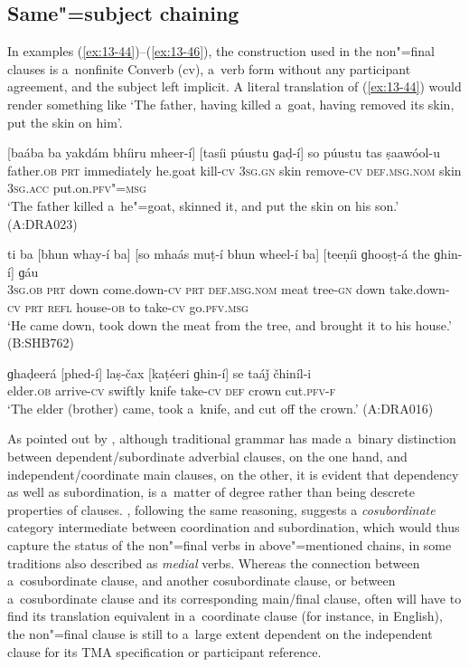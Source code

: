 \subsection{Same"=subject chaining}
\label{subsec:13-3-1}

In examples (\ref{ex:13-44})--(\ref{ex:13-46}), the construction used in the non"=final clauses is a~nonfinite Converb (cv), a~verb form without any participant agreement, and the subject left implicit. A literal translation of (\ref{ex:13-44}) would render something like `The father, having killed a~goat, having removed its skin, put the skin on him'. 

\begin{exe}
\ex
\label{ex:13-44}
\gll \label{bkm:Ref190770484}[baába ba yakdám bhíiru mheer-í] [tasíi púustu ɡaḍ-í] so púustu tas ṣaawóol-u  \\
father.\textsc{ob} \textsc{prt} immediately he.goat kill-\textsc{cv} \textsc{3sg.gn} skin  remove-\textsc{cv} \textsc{def.msg.nom} skin \textsc{3sg.acc} put.on.\textsc{pfv"=msg} \\
\glt `The father killed a~he"=goat, skinned it, and put the skin on his son.' (A:DRA023)

\ex
\label{ex:13-45}
\gll ti ba [bhun whay-í ba] [so  mhaás muṭ-í bhun wheel-í ba] [teeṇíi
  ɡhooṣṭ-á the ɡhin-í] ɡáu \\
\textsc{3sg.ob} \textsc{prt} down come.down-\textsc{cv} \textsc{prt} \textsc{def.msg.nom}  meat tree-\textsc{gn} down take.down-\textsc{cv} \textsc{prt} \textsc{refl} house-\textsc{ob}  to take-\textsc{cv} go.\textsc{pfv.msg} \\
\glt `He came down, took down the meat from the tree, and brought it to his house.' (B:SHB762)

\ex
\label{ex:13-46}
\gll ɡhaḍeerá [phed-í] laṣ-čax [kaṭéeri ɡhin-í] se taáǰ čhiníl-i  \\
elder.\textsc{ob} arrive-\textsc{cv} swiftly knife take-\textsc{cv} \textsc{def} crown cut.\textsc{pfv-f} \\
\glt `The elder (brother) came, took a~knife, and cut off the crown.' (A:DRA016) 
\end{exe}

As pointed out by \citet[327-8]{givon2001b}, although traditional grammar has made a~binary distinction between dependent/subordinate adverbial clauses, on the one hand, and independent/coordinate main clauses, on the other, it is evident that dependency as well as subordination, is a~matter of degree rather than being descrete properties of clauses. \citet[20--27]{haspelmath1995}, following the same reasoning, suggests a \textit{cosubordinate} category intermediate between coordination and subordination, which would thus capture the status of the non"=final verbs in above"=mentioned chains, in some traditions also described as \textit{medial} verbs. Whereas the connection between a~cosubordinate clause, and another cosubordinate clause, or between a~cosubordinate clause and its corresponding main/final clause, often will have to find its translation equivalent in a~coordinate clause (for instance, in English), the non"=final clause is still to a~large extent dependent on the independent clause for its TMA specification or participant reference.



